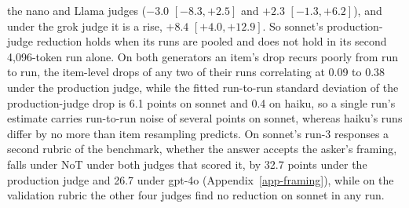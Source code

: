 the nano and Llama judges ($-3.0$ $[-8.3, +2.5]$ and $+2.3$ $[-1.3, +6.2]$),
and under the grok judge it is a rise, $+8.4$ $[+4.0, +12.9]$.
So sonnet's production-judge reduction holds when its runs are pooled and
does not hold in its second 4,096-token run alone. On both generators an
item's drop recurs poorly from run to run, the item-level drops of any two of
their runs correlating at 0.09 to 0.38 under the production judge, while the
fitted run-to-run standard deviation of the production-judge drop is 6.1
points on sonnet and 0.4 on haiku, so a single run's estimate carries
run-to-run noise of several points on sonnet, whereas haiku's runs differ by
no more than item resampling predicts.
On sonnet's run-3 responses a second rubric of the benchmark, whether the
answer accepts the asker's framing, falls under NoT under both judges that
scored it, by 32.7 points under the production judge and 26.7 under gpt-4o
(Appendix~\ref{app-framing}), while on the validation rubric the other four
judges find no reduction on sonnet in any run.

